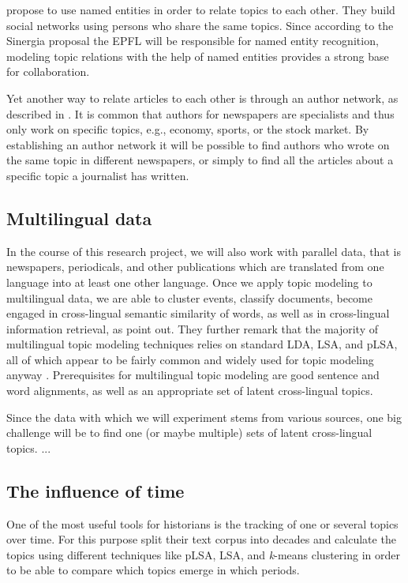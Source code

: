 \citet{newmanprobabilistic2006} propose to use named entities in order to relate topics to each other. They build social networks using persons who share the same topics. Since according to the Sinergia proposal the EPFL will be responsible for named entity recognition, modeling topic relations with the help of named entities provides a strong base for collaboration. 

Yet another way to relate articles to each other is through an author network, as described in \citet{rosenauthor2004}. It is common that authors for newspapers are specialists and thus only work on specific topics, e.g., economy, sports, or the stock market. By establishing an author network it will be possible to find authors who wrote on the same topic in different newspapers, or simply to find all the articles about a specific topic a journalist has written. 

\subsection{Multilingual data}
In the course of this research project, we will also work with parallel data, that is newspapers, periodicals, and other publications which are translated from one language into at least one other language. Once we apply topic modeling to multilingual data, we are able to cluster events, classify documents, become engaged in cross-lingual semantic similarity of words, as well as in cross-lingual information retrieval, as \citet{vulicprobabilistic2015} point out. They further remark that the majority of multilingual topic modeling techniques relies on standard LDA, LSA, and pLSA, all of which appear to be fairly common and widely used for topic modeling anyway \citep{dumaisautomatic1997,mimnopolylingual2009,zhangcrosslingual2010,nicross2011}. Prerequisites for multilingual topic modeling are good sentence and word alignments, as well as an appropriate set of latent cross-lingual topics.

Since the data with which we will experiment stems from various sources, one big challenge will be to find one (or maybe multiple) sets of latent cross-lingual topics.  ...

\subsection{The influence of time}
\label{timeinfluence}
One of the most useful tools for historians is the tracking of one or several topics over time. For this purpose \citet{newmanprobabilistic2006} split their text corpus into decades and calculate the topics using different techniques like pLSA, LSA, and \textit{k}-means clustering in order to be able to compare which topics emerge in which periods.

